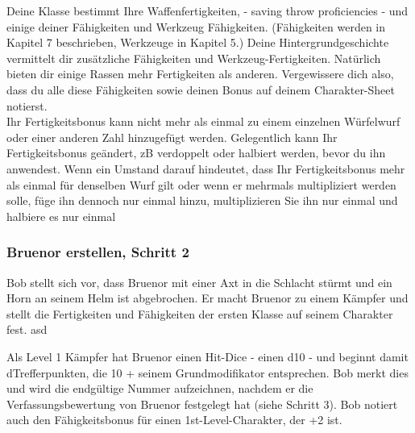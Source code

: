 Deine Klasse bestimmt Ihre Waffenfertigkeiten, - saving throw proficiencies -
 und einige deiner Fähigkeiten und Werkzeug Fähigkeiten. (Fähigkeiten werden in Kapitel 7 beschrieben, Werkzeuge in Kapitel 5.) Deine Hintergrundgeschichte vermittelt dir zusätzliche Fähigkeiten und Werkzeug-Fertigkeiten. Natürlich bieten dir einige Rassen mehr Fertigkeiten als anderen. Vergewissere dich also, dass du alle diese Fähigkeiten sowie deinen  Bonus auf deinem Charakter-Sheet notierst.\\
Ihr Fertigkeitsbonus kann nicht mehr als einmal zu einem einzelnen Würfelwurf oder einer anderen Zahl hinzugefügt werden. Gelegentlich kann Ihr Fertigkeitsbonus geändert, zB verdoppelt oder halbiert werden, bevor du ihn anwendest. Wenn ein Umstand darauf hindeutet, dass Ihr Fertigkeitsbonus mehr als einmal für denselben Wurf gilt oder wenn er mehrmals multipliziert werden solle, füge ihn dennoch nur einmal hinzu, multiplizieren Sie ihn nur einmal und halbiere es nur einmal
\subsubsection{Bruenor erstellen, Schritt 2}
Bob stellt sich vor, dass Bruenor mit einer Axt in die Schlacht stürmt und ein Horn an seinem Helm ist abgebrochen. Er macht Bruenor zu einem Kämpfer und stellt die Fertigkeiten und Fähigkeiten der ersten Klasse auf seinem Charakter fest. %
asd

Als Level 1 Kämpfer hat Bruenor einen Hit-Dice - einen d10 - und beginnt damit dTrefferpunkten, die 10 + seinem Grundmodifikator entsprechen. Bob merkt dies und wird die endgültige Nummer aufzeichnen, nachdem er die Verfassungsbewertung von Bruenor festgelegt hat (siehe Schritt 3). Bob notiert auch den Fähigkeitsbonus für einen 1st-Level-Charakter, der +2 ist.

